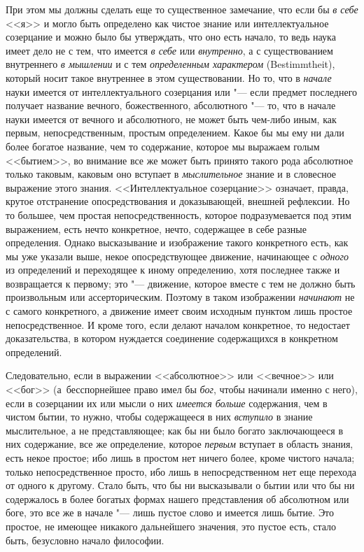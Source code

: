 При этом мы должны сделать еще то существенное замечание, что если бы
{\em в себе} <<я>> и могло быть определено как чистое
знание или интеллектуальное созерцание и можно было бы утверждать, что оно
есть начало, то ведь наука имеет дело не с тем, что имеется
{\em в себе} или {\em внутренно}, а
с существованием внутреннего {\em в мышлении} и с тем
{\em определенным характером} (Bestimmtheit), который
носит такое внутреннее в этом существовании. Но то, что в
{\em начале} науки имеется от интеллектуального
созерцания или "--- если предмет последнего получает название вечного,
божественного, абсолютного "--- то, что в начале науки имеется от вечного и
абсолютного, не может быть чем-либо иным, как первым, непосредственным,
простым определением. Какое бы мы ему ни дали более богатое название, чем
то содержание, которое мы выражаем голым <<бытием>>, во внимание все же может
быть принято такого рода абсолютное только таковым, каковым оно вступает в
{\em мыслительное} знание и в словесное выражение этого
знания. <<Интеллектуальное созерцание>> означает, правда, крутое отстранение
опосредствования и доказывающей, внешней рефлексии. Но то большее, чем
простая непосредственность, которое подразумевается под этим выражением,
есть нечто конкретное, нечто, содержащее в себе разные определения. Однако
высказывание и изображение такого конкретного есть, как мы уже указали
выше, некое опосредствующее движение, начинающее с
{\em одного} из определений и переходящее к иному
определению, хотя последнее также и возвращается к первому; это "--- движение,
которое вместе с тем не должно быть произвольным или ассерторическим.
Поэтому в таком изображении {\em начинают} не с самого
конкретного, а движение имеет своим исходным пунктом лишь простое
непосредственное. И кроме того, если делают началом конкретное, то
недостает доказательства, в котором нуждается соединение содержащихся в
конкретном определений.

Следовательно, если в выражении <<абсолютное>> или <<вечное>> или <<бог>>
(а~бесспорнейшее право имел бы {\em бог}, чтобы начинали
именно с него), если в созерцании их или мысли о них
{\em имеется больше} содержания, чем в чистом бытии, то
нужно, чтобы содержащееся в них {\em вступило} в знание
мыслительное, а не представляющее; как бы ни было богато заключающееся в
них содержание, все же определение, которое
{\em первым} вступает в область знания, есть некое
простое; ибо лишь в простом нет ничего более, кроме чистого начала; только
непосредственное просто, ибо лишь в непосредственном нет еще перехода от
одного к другому. Стало быть, что бы ни высказывали о бытии или что бы ни
содержалось в более богатых формах нашего представления об абсолютном или
боге, это все же в начале "--- лишь пустое слово и имеется лишь бытие. Это
простое, не имеющее никакого дальнейшего значения, это пустое есть, стало
быть, безусловно начало философии.


